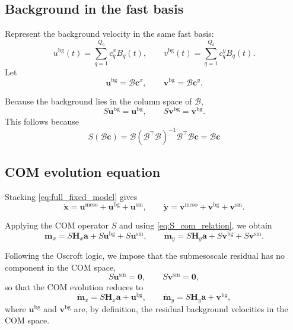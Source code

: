 \documentclass{article}
\begin{document}
\subsection{Background in the fast basis}

Represent the background velocity in the same fast basis:
\begin{equation}
u^{\mathrm{bg}}(t)=\sum_{q=1}^{Q_b} c_q^x B_q(t),
\qquad
v^{\mathrm{bg}}(t)=\sum_{q=1}^{Q_b} c_q^y B_q(t).
\label{eq:bg_model}
\end{equation}
Let
\begin{equation}
\mathbf{u}^{\mathrm{bg}}=\mathcal{B}\mathbf{c}^x,
\qquad
\mathbf{v}^{\mathrm{bg}}=\mathcal{B}\mathbf{c}^y.
\label{eq:bg_stacked}
\end{equation}

Because the background lies in the column space of $\mathcal{B}$,
\begin{equation}
S\mathbf{u}^{\mathrm{bg}}=\mathbf{u}^{\mathrm{bg}},
\qquad
S\mathbf{v}^{\mathrm{bg}}=\mathbf{v}^{\mathrm{bg}}.
\label{eq:bg_invariant}
\end{equation}
This follows because
\begin{equation}
S(\mathcal{B}\mathbf{c})
=
\mathcal{B}(\mathcal{B}^\top \mathcal{B})^{-1}\mathcal{B}^\top \mathcal{B}\mathbf{c}
=
\mathcal{B}\mathbf{c}
\end{equation}

\subsection{COM evolution equation}

Stacking \eqref{eq:full_fixed_model} gives
\begin{equation}
\dot{\mathbf{x}}
=
\mathbf{u}^{\mathrm{meso}}+\mathbf{u}^{\mathrm{bg}}+\mathbf{u}^{\mathrm{sm}},
\qquad
\dot{\mathbf{y}}
=
\mathbf{v}^{\mathrm{meso}}+\mathbf{v}^{\mathrm{bg}}+\mathbf{v}^{\mathrm{sm}}.
\label{eq:full_stacked}
\end{equation}

Applying the COM operator \(S\) and using \eqref{eq:S_com_relation}, we obtain
\begin{equation}
\dot{\mathbf{m}}_x
=
S\mathbf{H}_x\mathbf{a}
+
S\mathbf{u}^{\mathrm{bg}}
+
S\mathbf{u}^{\mathrm{sm}},
\qquad
\dot{\mathbf{m}}_y
=
S\mathbf{H}_y\mathbf{a}
+
S\mathbf{v}^{\mathrm{bg}}
+
S\mathbf{v}^{\mathrm{sm}}.
\end{equation}

Following the Oscroft logic, we impose that the submesoscale residual has no component
in the COM space,
\begin{equation}
S\mathbf{u}^{\mathrm{sm}}=\mathbf{0},
\qquad
S\mathbf{v}^{\mathrm{sm}}=\mathbf{0},
\label{eq:sm_zero_mean}
\end{equation}
so that the COM evolution reduces to
\begin{equation}
\dot{\mathbf{m}}_x
=
S\mathbf{H}_x\mathbf{a}
+
\mathbf{u}^{\mathrm{bg}},
\qquad
\dot{\mathbf{m}}_y
=
S\mathbf{H}_y\mathbf{a}
+
\mathbf{v}^{\mathrm{bg}},
\label{eq:com_equation_joint}
\end{equation}
where \(\mathbf{u}^{\mathrm{bg}}\) and \(\mathbf{v}^{\mathrm{bg}}\) are, by definition,
the residual background velocities in the COM space.
\end{document}
